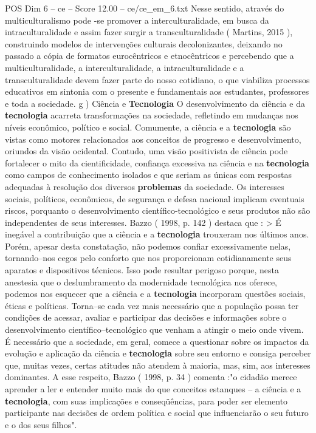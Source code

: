 \begin{textsample}{POS Dim 6 – ce – Score 12.00 – ce/ce\_em\_6.txt}
Nesse sentido, através do multiculturalismo pode -se promover a interculturalidade, em busca da intraculturalidade e assim fazer surgir a transculturalidade ( Martins, 2015 ), construindo modelos de intervenções culturais decolonizantes, deixando no passado a cópia de formatos eurocêntricos e etnocêntricos e percebendo que a multiculturalidade, a interculturalidade, a intraculturalidade e a transculturalidade devem fazer parte do nosso cotidiano, o que viabiliza processos educativos em sintonia com o presente e fundamentais aos estudantes, professores e toda a sociedade. g ) Ciência e \textbf{Tecnologia} O desenvolvimento da ciência e da \textbf{tecnologia} acarreta transformações na sociedade, refletindo em mudanças nos níveis econômico, político e social.
Comumente, a ciência e a \textbf{tecnologia} são vistas como motores relacionados aos conceitos de progresso e desenvolvimento, oriundos da visão ocidental.
Contudo, uma visão positivista de ciência pode fortalecer o mito da cientificidade, confiança excessiva na ciência e na \textbf{tecnologia} como campos de conhecimento isolados e que seriam as únicas com respostas adequadas à resolução dos diversos \textbf{problemas} da sociedade.
Os interesses sociais, políticos, econômicos, de segurança e defesa nacional implicam eventuais riscos, porquanto o desenvolvimento científico-tecnológico e seus produtos não são independentes de seus interesses.
Bazzo ( 1998, p. 142 ) destaca que : > É inegável a contribuição que a ciência e a \textbf{tecnologia} trouxeram nos últimos anos.
Porém, apesar desta constatação, não podemos confiar excessivamente nelas, tornando–nos cegos pelo conforto que nos proporcionam cotidianamente seus aparatos e dispositivos técnicos.
Isso pode resultar perigoso porque, nesta anestesia que o deslumbramento da modernidade tecnológica nos oferece, podemos nos esquecer que a ciência e a \textbf{tecnologia} incorporam questões sociais, éticas e políticas.
Torna–se cada vez mais necessário que a população possa ter condições de acessar, avaliar e participar das decisões e informações sobre o desenvolvimento científico–tecnológico que venham a atingir o meio onde vivem.
É necessário que a sociedade, em geral, comece a questionar sobre os impactos da evolução e aplicação da ciência e \textbf{tecnologia} sobre seu entorno e consiga perceber que, muitas vezes, certas atitudes não atendem à maioria, mas, sim, aos interesses dominantes.
A esse respeito, Bazzo ( 1998, p. 34 ) comenta :"o cidadão merece aprender a ler e entender muito mais do que conceitos estanques – a ciência e a \textbf{tecnologia}, com suas implicações e conseqüências, para poder ser elemento participante nas decisões de ordem política e social que influenciarão o seu futuro e o dos seus filhos".

\end{textsample}
